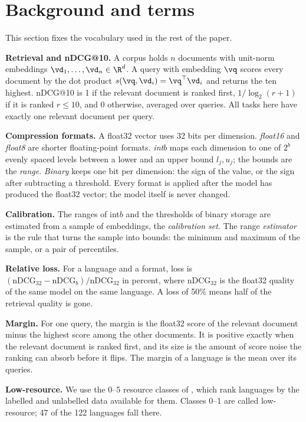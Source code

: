 \documentclass[10pt]{article}
\begin{document}
\section{Background and terms}\label{sec:terms}
This section fixes the vocabulary used in the rest of the paper.

\textbf{Retrieval and nDCG@10.} A corpus holds $n$ documents with unit-norm embeddings $\vd_1,\dots,\vd_n\in\R^d$. A query with embedding $\vq$ scores every document by the dot product $s(\vq,\vd_i)=\vq^\top\vd_i$ and returns the ten highest. nDCG@10 is 1 if the relevant document is ranked first, $1/\log_2(r+1)$ if it is ranked $r\le10$, and 0 otherwise, averaged over queries. All tasks here have exactly one relevant document per query.

\textbf{Compression formats.} A float32 vector uses 32 bits per dimension. \emph{float16} and \emph{float8} are shorter floating-point formats. \emph{int$b$} maps each dimension to one of $2^b$ evenly spaced levels between a lower and an upper bound $l_j,u_j$; the bounds are the \emph{range}. \emph{Binary} keeps one bit per dimension: the sign of the value, or the sign after subtracting a threshold. Every format is applied after the model has produced the float32 vector; the model itself is never changed.

\textbf{Calibration.} The ranges of int$b$ and the thresholds of binary storage are estimated from a sample of embeddings, the \emph{calibration set}. The range \emph{estimator} is the rule that turns the sample into bounds: the minimum and maximum of the sample, or a pair of percentiles.

\textbf{Relative loss.} For a language and a format, loss is $(\mathrm{nDCG}_{32}-\mathrm{nDCG}_{b})/\mathrm{nDCG}_{32}$ in percent, where $\mathrm{nDCG}_{32}$ is the float32 quality of the same model on the same language. A loss of 50\% means half of the retrieval quality is gone.

\textbf{Margin.} For one query, the margin is the float32 score of the relevant document minus the highest score among the other documents. It is positive exactly when the relevant document is ranked first, and its size is the amount of score noise the ranking can absorb before it flips. The margin of a language is the mean over its queries.

\textbf{Low-resource.} We use the 0--5 resource classes of \citet{joshi2020state}, which rank languages by the labelled and unlabelled data available for them. Classes 0--1 are called low-resource; 47 of the 122 languages fall there.
\end{document}

